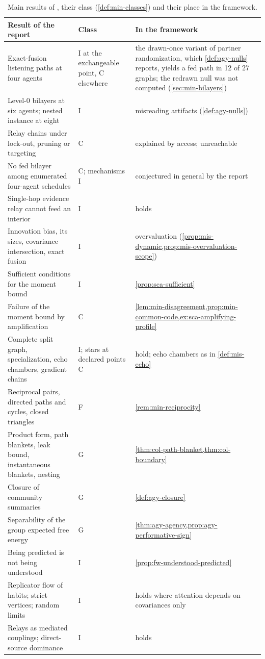 \begin{table}[t]
\centering\small
\caption{Main results of \citet{dennis2026communicating}, their class (\cref{def:min-classes}) and their place in the framework.}\label{tab:min-results}
\begin{tabular}{@{}>{\raggedright\arraybackslash}p{}>{\raggedright\arraybackslash}p{}>{\raggedright\arraybackslash}p{}@{}}
\toprule
Result of the report & Class & In the framework \\
\midrule
Exact-fusion listening paths at four agents & I at the exchangeable point, C elsewhere & the drawn-once variant of partner randomization, which \cref{def:agy-nulls} reports, yields a fed path in 12 of 27 graphs; the redrawn null was not computed (\cref{sec:min-bilayers}) \\
Level-0 bilayers at six agents; nested instance at eight & I & misreading artifacts (\cref{def:agy-nulls}) \\
Relay chains under lock-out, pruning or targeting & C & explained by access; unreachable \\
No fed bilayer among enumerated four-agent schedules & C; mechanisms I & conjectured in general by the report \\
Single-hop evidence relay cannot feed an interior & I & holds \\
Innovation bias, its sizes, covariance intersection, exact fusion & I & overvaluation (\cref{prop:mis-dynamic,prop:mis-overvaluation-scope}) \\
Sufficient conditions for the moment bound & I & \cref{prop:sca-sufficient} \\
Failure of the moment bound by amplification & C & \cref{lem:min-disagreement,prop:min-common-code,ex:sca-amplifying-profile} \\
Complete split graph, specialization, echo chambers, gradient chains & I; stars at declared points C & hold; echo chambers as in \cref{def:mis-echo} \\
Reciprocal pairs, directed paths and cycles, closed triangles & F & \cref{rem:min-reciprocity} \\
Product form, path blankets, leak bound, instantaneous blankets, nesting & G & \cref{thm:col-path-blanket,thm:col-boundary} \\
Closure of community summaries & G & \cref{def:agy-closure} \\
Separability of the group expected free energy & G & \cref{thm:agy-agency,prop:agy-performative-sign} \\
Being predicted is not being understood & I & \cref{prop:fw-understood-predicted} \\
Replicator flow of habits; strict vertices; random limits & I & holds where attention depends on covariances only \\
Relays as mediated couplings; direct-source dominance & I & holds \\
\bottomrule
\end{tabular}
\end{table}

